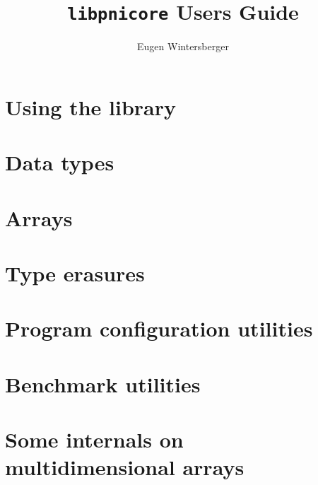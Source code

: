 \documentclass[a4paper]{scrbook}
\title{{\Huge{\tt libpnicore} Users Guide}}
\author{Eugen Wintersberger}
\begin{document}
\maketitle
\tableofcontents

\chapter{Using the library}\label{chapter:using_library}
\FloatBarrier 

\chapter{Data types}\label{chapter:data_types}

\FloatBarrier

\chapter{Arrays}\label{chapter:arrays}

\FloatBarrier

\chapter{Type erasures}\label{chapter:type_erasures}
\FloatBarrier

\chapter{Program configuration utilities}\label{chapter:configuration}

\FloatBarrier

\chapter{Benchmark utilities}\label{chapter:benchmark}
\FloatBarrier

\appendix
\chapter{Some internals on multidimensional arrays}

\FloatBarrier
\end{document}
